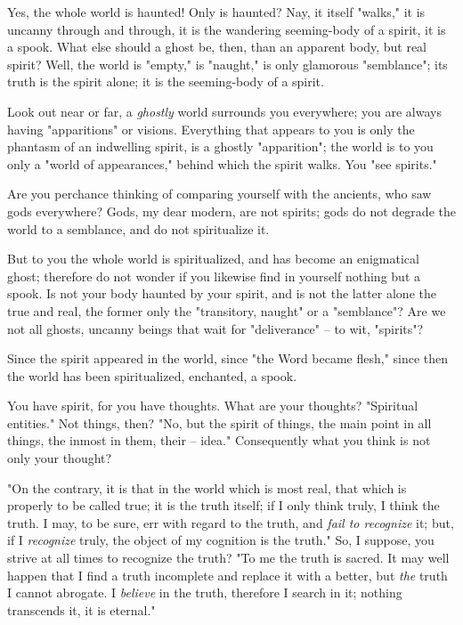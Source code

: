 Yes, the whole world is haunted! Only is haunted? Nay, it itself "{}walks,"{} 
it is uncanny through and through, it is the wandering seeming-body of a 
spirit, it is a spook. What else should a ghost be, then, than an apparent 
body, but real spirit? Well, the world is "{}empty,"{} is "{}naught,"{} is 
only glamorous "{}semblance"{}; its truth is the spirit alone; it is the 
seeming-body of a spirit.

Look out near or far, a \textit{ghostly} world surrounds you everywhere; you 
are always having "{}apparitions"{} or visions. Everything that appears to you 
is only the phantasm of an indwelling spirit, is a ghostly "{}apparition"{}; 
the world is to you only a "{}world of appearances,"{} behind which the spirit 
walks. You "{}see spirits."{}

Are you perchance thinking of comparing yourself with the ancients, who saw 
gods everywhere? Gods, my dear modern, are not spirits; gods do not degrade 
the world to a semblance, and do not spiritualize it.

But to you the whole world is spiritualized, and has become an enigmatical 
ghost; therefore do not wonder if you likewise find in yourself nothing but a 
spook. Is not your body haunted by your spirit, and is not the latter alone 
the true and real, the former only the "{}transitory, naught"{} or a 
"{}semblance"{}? Are we not all ghosts, uncanny beings that wait for 
"{}deliverance"{} -- to wit, "{}spirits"{}?

Since the spirit appeared in the world, since "{}the Word became flesh,"{} 
since then the world has been spiritualized, enchanted, a spook.

You have spirit, for you have thoughts. What are your thoughts? "{}Spiritual 
entities."{} Not things, then? "{}No, but the spirit of things, the main point 
in all things, the inmost in them, their -- idea."{} Consequently what you 
think is not only your thought?

"{}On the contrary, it is that in the world which is most real, that which is 
properly to be called true; it is the truth itself; if I only think truly, I 
think the truth. I may, to be sure, err with regard to the truth, and 
\textit{fail to recognize} it; but, if I \textit{recognize} truly, the object 
of my cognition is the truth."{} So, I suppose, you strive at all times to 
recognize the truth? "{}To me the truth is sacred. It may well happen that I 
find a truth incomplete and replace it with a better, but \textit{the} truth I 
cannot abrogate. I \textit{believe} in the truth, therefore I search in it; 
nothing transcends it, it is eternal."{}

